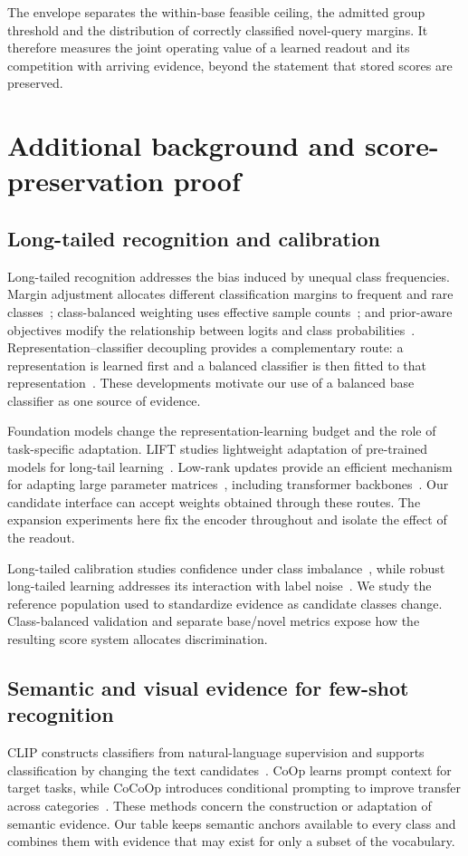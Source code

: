 \documentclass[preprint,review,12pt]{elsarticle}
\begin{document}
The envelope separates the within-base feasible ceiling, the admitted group
threshold and the distribution of correctly classified novel-query margins.
It therefore measures the joint operating value of a learned readout and its
competition with arriving evidence, beyond the statement that stored scores
are preserved.

\section{Additional background and score-preservation proof}
\subsection{Long-tailed recognition and calibration}
Long-tailed recognition addresses the bias induced by unequal class frequencies. Margin adjustment allocates different classification margins to frequent and rare classes~\cite{cao2019ldam}; class-balanced weighting uses effective sample counts~\cite{cui2019classbalanced}; and prior-aware objectives modify the relationship between logits and class probabilities~\cite{ren2020bsm,menon2021logitadj}. Representation--classifier decoupling provides a complementary route: a representation is learned first and a balanced classifier is then fitted to that representation~\cite{kang2020decoupling}. These developments motivate our use of a balanced base classifier as one source of evidence.

Foundation models change the representation-learning budget and the role of task-specific adaptation. LIFT studies lightweight adaptation of pre-trained models for long-tail learning~\cite{shi2024lift}. Low-rank updates provide an efficient mechanism for adapting large parameter matrices~\cite{hu2022lora}, including transformer backbones~\cite{dosovitskiy2021vit}. Our candidate interface can accept weights obtained through these routes. The expansion experiments here fix the encoder throughout and isolate the effect of the readout.

Long-tailed calibration studies confidence under class imbalance~\cite{zhong2021mislas}, while robust long-tailed learning addresses its interaction with label noise~\cite{wei2026robust}. We study the reference population used to standardize evidence as candidate classes change. Class-balanced validation and separate base/novel metrics expose how the resulting score system allocates discrimination.

\subsection{Semantic and visual evidence for few-shot recognition}
CLIP constructs classifiers from natural-language supervision and supports classification by changing the text candidates~\cite{radford2021clip}. CoOp learns prompt context for target tasks, while CoCoOp introduces conditional prompting to improve transfer across categories~\cite{zhou2022coop,zhou2022cocoop}. These methods concern the construction or adaptation of semantic evidence. Our table keeps semantic anchors available to every class and combines them with evidence that may exist for only a subset of the vocabulary.
\end{document}
